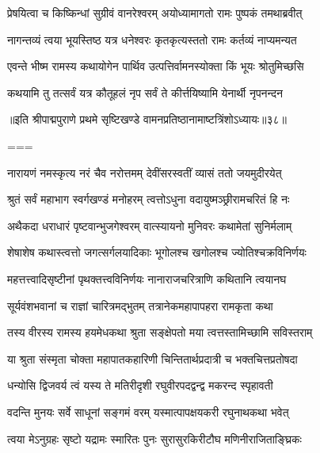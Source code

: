 \twolineshloka
{प्रेषयित्वा च किष्किन्धां सुग्रीवं वानरेश्वरम्}
{अयोध्यामागतो रामः पुष्पकं तमथाब्रवीत्}%

\twolineshloka
{नागन्तव्यं त्वया भूयस्तिष्ठ यत्र धनेश्वरः}
{कृतकृत्यस्ततो रामः कर्तव्यं नाप्यमन्यत}%


\twolineshloka
{एवन्ते भीष्म रामस्य कथायोगेन पार्थिव}
{उत्पत्तिर्वामनस्योक्ता किं भूयः श्रोतुमिच्छसि}%

\twolineshloka
{कथयामि तु तत्सर्वं यत्र कौतूहलं नृप}
{सर्वं ते कीर्त्तयिष्यामि येनार्थी नृपनन्दन}%

{॥इति श्रीपाद्मपुराणे प्रथमे सृष्टिखण्डे वामनप्रतिष्ठानामाष्टत्रिंशोऽध्यायः॥३८॥}


===



\twolineshloka
{नारायणं नमस्कृत्य नरं चैव नरोत्तमम्}
{देवींसरस्वतीं व्यासं ततो जयमुदीरयेत्}%


\twolineshloka
{श्रुतं सर्वं महाभाग स्वर्गखण्डं मनोहरम्}
{त्वत्तोऽधुना वदायुष्मञ्छ्रीरामचरितं हि नः}%


\twolineshloka
{अथैकदा धराधारं पृष्टवान्भुजगेश्वरम्}
{वात्स्यायनो मुनिवरः कथामेतां सुनिर्मलाम्}%


\twolineshloka
{शेषाशेष कथास्त्वत्तो जगत्सर्गलयादिकाः}
{भूगोलश्च खगोलश्च ज्योतिश्चक्रविनिर्णयः}%

\twolineshloka
{महत्तत्त्वादिसृष्टीनां पृथक्तत्त्वविनिर्णयः}
{नानाराजचरित्राणि कथितानि त्वयानघ}%

\twolineshloka
{सूर्यवंशभवानां च राज्ञां चारित्रमद्भुतम्}
{तत्रानेकमहापापहरा रामकृता कथा}%

\twolineshloka
{तस्य वीरस्य रामस्य हयमेधकथा श्रुता}
{सङ्क्षेपतो मया त्वत्तस्तामिच्छामि सविस्तराम्}%

\twolineshloka
{या श्रुता संस्मृता चोक्ता महापातकहारिणी}
{चिन्तितार्थप्रदात्री च भक्तचित्तप्रतोषदा}%


\twolineshloka
{धन्योसि द्विजवर्य त्वं यस्य ते मतिरीदृशी}
{रघुवीरपदद्वन्द्व मकरन्द स्पृहावती}%

\twolineshloka
{वदन्ति मुनयः सर्वे साधूनां सङ्गमं वरम्}
{यस्मात्पापक्षयकरी रघुनाथकथा भवेत्}%

\twolineshloka
{त्वया मेऽनुग्रहः सृष्टो यद्रामः स्मारितः पुनः}
{सुरासुरकिरीटौघ मणिनीराजिताङ्घ्रिकः}%


